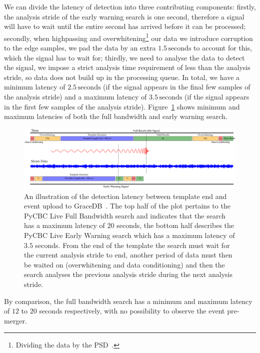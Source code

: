 We can divide the latency of detection into three contributing components: firstly, the analysis stride of the early warning search is one second, therefore a signal will have to wait until the entire second has arrived before it can be processed; secondly, when highpassing and overwhitening\footnote{Dividing the data by the PSD~\cite{FINDCHIRP:2012}.} our data we introduce corruption to the edge samples, we pad the data by an extra $1.5 \, \text{seconds}$ to account for this, which the signal has to wait for; thirdly, we need to analyse the data to detect the signal, we impose a strict analysis time requirement of less than the analysis stride, so data does not build up in the processing queue. In total, we have a minimum latency of $2.5 \, \text{seconds}$ (if the signal appears in the final few samples of the analysis stride) and a maximum latency of $3.5 \, \text{seconds}$ (if the signal appears in the first few samples of the analysis stride). Figure~\ref{6:fig:latency_plot} shows minimum and maximum latencies of both the full bandwidth and early warning search.
%
\begin{landscape}
\begin{figure}
    \centering
    \includegraphics[width=\columnwidth]{images/6_earlywarning/gw170817/latency_plot_new_font.pdf}
    \caption{An illustration of the detection latency between template end and event upload to GraceDB~\cite{ligo_gracedb:2024}. The top half of the plot pertains to the PyCBC Live Full Bandwidth search and indicates that the search has a maximum latency of $20$ seconds, the bottom half describes the PyCBC Live Early Warning search which has a maximum latency of $3.5$ seconds. From the end of the \gwadj template the search must wait for the current analysis stride to end, another period of data must then be waited on (overwhitening and data conditioning) and then the search analyses the previous analysis stride during the next analysis stride.}
    \label{6:fig:latency_plot}
\end{figure}
\end{landscape}
%
By comparison, the full bandwidth search has a minimum and maximum latency of $12$ to $20$ seconds respectively, with no possibility to observe the event pre-merger.

